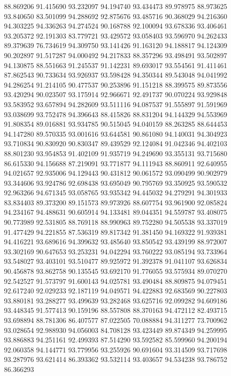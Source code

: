 88.869206
91.415690
93.232097
94.194740
93.434473
89.978975
88.973625
93.840650
83.501099
94.288692
92.875676
93.485716
90.368029
94.216360
94.303225
94.336263
94.274524
90.168788
92.100094
93.678336
93.406461
93.205372
92.191303
83.779721
93.429572
93.058403
93.596970
94.262433
89.379639
76.734619
94.309750
93.141426
91.163120
94.188817
94.124309
90.202897
91.517287
94.000492
94.217833
88.357296
93.498491
93.502897
94.130875
88.551663
91.245537
91.142231
89.693017
93.554561
91.411461
87.862543
90.733634
93.926937
93.598428
94.350344
89.543048
94.041992
94.286254
91.214105
90.477537
90.253896
91.151218
88.399575
89.873556
93.420294
90.023507
93.175914
92.966671
92.491737
90.070224
93.929848
93.583952
93.657894
94.282609
93.511116
94.087537
91.555897
91.591969
93.038699
93.752478
94.396643
88.415826
88.831204
94.144329
94.553969
91.808354
89.016881
93.934785
90.515045
94.040159
88.263285
88.644453
94.147280
89.570335
93.001616
93.644581
90.861080
94.140031
94.304923
93.710834
90.830920
90.830347
89.439529
92.124084
91.042346
94.402103
88.801230
93.954853
91.402109
91.935719
94.249690
93.355131
93.715680
86.615330
94.156688
87.219091
93.771877
94.111943
88.860911
92.640955
94.021657
92.935006
94.129443
90.431812
90.061572
93.090499
90.902979
93.344606
93.924786
92.698438
93.695049
90.795769
93.350925
93.590532
92.963266
94.671345
93.058765
93.935342
94.445032
94.279291
94.301933
83.834403
89.373200
89.151573
89.973926
88.607754
93.961900
92.085824
94.234167
94.488631
90.605914
94.133481
89.044351
94.559787
93.408075
90.773989
92.531805
88.769118
88.990963
89.752280
94.505538
93.337019
91.477429
94.221855
87.536319
89.817342
91.381450
94.169322
91.939381
94.416221
93.689616
94.399632
93.485640
93.850542
93.439199
88.972007
93.302169
90.647653
93.253231
94.042294
93.760222
93.085194
93.733964
93.548027
93.403101
93.510477
89.925972
91.392378
91.041107
93.626834
90.456878
93.862758
90.135545
93.692170
91.776055
93.575934
89.070270
92.542527
91.573797
91.600143
94.025781
93.490484
88.809875
94.079451
92.617240
92.029233
92.187119
94.049571
94.422883
92.683569
90.227803
93.880181
93.288277
93.499639
93.282468
93.625716
92.099282
94.609186
93.448345
91.577413
90.159196
88.557808
88.370163
94.472112
82.493715
93.698894
88.781306
86.407577
87.022505
70.088884
94.311277
73.700962
93.028654
92.988930
94.056003
84.708128
93.423449
89.874349
94.259995
93.886883
94.251161
92.499393
87.514290
93.592582
85.599960
94.200194
92.060358
94.144771
93.779956
93.255926
90.691604
93.314509
93.717698
93.287976
93.621414
86.393362
93.532114
93.403657
94.534238
93.786752
86.366293
